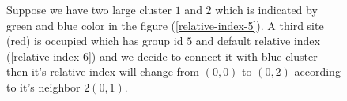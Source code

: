 \documentclass[10pt,a4paper]{report}
\begin{document}
	\begin{figure}
	\centering
	\caption{Suppose we have two large cluster $1$ and $2$ which is indicated by green and blue color in the figure (\ref{relative-index-5}). A third site (red) is occupied which has group id $5$ and default relative index (\ref{relative-index-6}) and we decide to connect it with blue cluster then it's relative index will change from $(0,0)$ to $(0,2)$ according to it's neighbor $2(0,1)$.
	}
	\label{fig:relative-index-2}
\end{figure}
\end{document}
